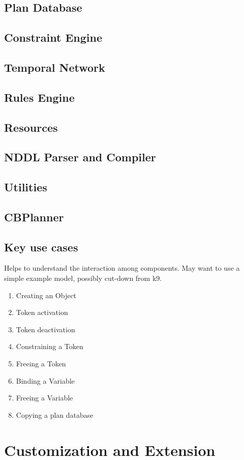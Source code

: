 \documentclass[10pt, letterpaper, twoside]{article}
\begin{document}
\subsection{Plan Database}
\subsection{Constraint Engine}
\subsection{Temporal Network}
\subsection{Rules Engine}
\subsection{Resources}
\subsection{NDDL Parser and Compiler}
\subsection{Utilities}
\subsection{CBPlanner}
\subsection{Key use cases}
Helps to understand the interaction among components. May want to use a simple example model, possibly cut-down from k9.
\begin{enumerate}
\item Creating an Object
\item Token activation
\item Token deactivation
\item Constraining a Token
\item Freeing a Token
\item Binding a Variable
\item Freeing a Variable
\item Copying a plan database
\end{enumerate}

\section{Customization and Extension}
\end{document}
